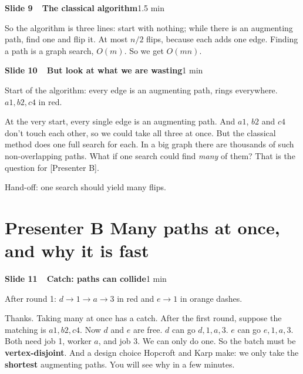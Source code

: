 \documentclass[11pt,a4paper]{article}
\newcommand{\slidehead}[3]{%
  \Needspace{9\baselineskip}\vspace{4pt}\noindent\colorbox{hkblue!12}{\parbox{\dimexpr\linewidth-2\fboxsep}{%
  \textbf{\color{hkblue}Slide #1\ \ #2}\hfill{\small\color{hkgrey}#3}}}\par\vspace{2pt}}
\begin{document}
\slidehead{9}{The classical algorithm}{1.5 min}
\begin{say}
So the algorithm is three lines: start with nothing; while there is an augmenting path, find one and flip it. At most $n/2$ flips, because each adds one edge. Finding a path is a graph search, $O(m)$. So we get $O(mn)$.
\end{say}

\slidehead{10}{But look at what we are wasting}{1 min}
\begin{onscreen}
Start of the algorithm: every edge is an augmenting path, rings everywhere. $a1,b2,c4$ in red.
\end{onscreen}
\begin{say}
At the very start, every single edge is an augmenting path. And $a1$, $b2$ and $c4$ don't touch each other, so we could take all three at once. But the classical method does one full search for each. In a big graph there are thousands of such non-overlapping paths. What if one search could find \emph{many} of them? That is the question for [Presenter B].
\end{say}
\begin{key}Hand-off: one search should yield many flips.\end{key}

\part*{Presenter B \quad Many paths at once, and why it is fast}

\slidehead{11}{Catch: paths can collide}{1 min}
\begin{onscreen}
After round 1: $d\to1\to a\to3$ in red and $e\to1$ in orange dashes.
\end{onscreen}
\begin{say}
Thanks. Taking many at once has a catch. After the first round, suppose the matching is $a1, b2, c4$. Now $d$ and $e$ are free. $d$ can go $d,1,a,3$. $e$ can go $e,1,a,3$. Both need job 1, worker $a$, and job 3. We can only do one. So the batch must be \textbf{vertex-disjoint}. And a design choice Hopcroft and Karp make: we only take the \textbf{shortest} augmenting paths. You will see why in a few minutes.
\end{say}
\end{document}
